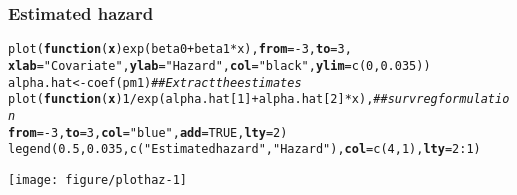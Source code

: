 \documentclass[color=usenames,dvipsnames]{beamer}\usepackage[]{graphicx}\usepackage[]{color}
\makeatletter
\newcommand{\hlnum}[1]{\textcolor[rgb]{0.69,0.494,0}{#1}}%
\newcommand{\hlstr}[1]{\textcolor[rgb]{0.749,0.012,0.012}{#1}}%
\newcommand{\hlcom}[1]{\textcolor[rgb]{0.514,0.506,0.514}{\textit{#1}}}%
\newcommand{\hlopt}[1]{\textcolor[rgb]{0,0,0}{#1}}%
\newcommand{\hlstd}[1]{\textcolor[rgb]{0,0,0}{#1}}%
\newcommand{\hlkwa}[1]{\textcolor[rgb]{0,0,0}{\textbf{#1}}}%
\newcommand{\hlkwb}[1]{\textcolor[rgb]{0,0.341,0.682}{#1}}%
\newcommand{\hlkwc}[1]{\textcolor[rgb]{0,0,0}{\textbf{#1}}}%
\newcommand{\hlkwd}[1]{\textcolor[rgb]{0.004,0.004,0.506}{#1}}%
\newenvironment{kframe}{%
 \def\at@end@of@kframe{}%
 \ifinner\ifhmode%
  \def\at@end@of@kframe{\end{minipage}}%
  \begin{minipage}{\columnwidth}%
 \fi\fi%
 \def\FrameCommand##1{\hskip\@totalleftmargin \hskip-\fboxsep
 \colorbox{shadecolor}{##1}\hskip-\fboxsep
     \hskip-\linewidth \hskip-\@totalleftmargin \hskip\columnwidth}%
 \MakeFramed {\advance\hsize-\width
   \@totalleftmargin\z@ \linewidth\hsize
   \@setminipage}}%
 {\par\unskip\endMakeFramed%
 \at@end@of@kframe}
\newenvironment{knitrout}{}{} %
\makeatother
\begin{document}
\begin{frame}[fragile]
  \frametitle{Estimated hazard}
\begin{knitrout}\scriptsize
{}\color{fgcolor}\begin{kframe}
\begin{alltt}
\hlkwd{plot}\hlstd{(}\hlkwa{function}\hlstd{(}\hlkwc{x}\hlstd{)} \hlkwd{exp}\hlstd{(beta0} \hlopt{+} \hlstd{beta1}\hlopt{*}\hlstd{x),} \hlkwc{from}\hlstd{=}\hlopt{-}\hlnum{3}\hlstd{,} \hlkwc{to}\hlstd{=}\hlnum{3}\hlstd{,}
     \hlkwc{xlab}\hlstd{=}\hlstr{"Covariate"}\hlstd{,} \hlkwc{ylab}\hlstd{=}\hlstr{"Hazard"}\hlstd{,} \hlkwc{col}\hlstd{=}\hlstr{"black"}\hlstd{,} \hlkwc{ylim}\hlstd{=}\hlkwd{c}\hlstd{(}\hlnum{0}\hlstd{,} \hlnum{0.035}\hlstd{))}
\hlstd{alpha.hat} \hlkwb{<-} \hlkwd{coef}\hlstd{(pm1)}   \hlcom{## Extract the estimates}
\hlkwd{plot}\hlstd{(}\hlkwa{function}\hlstd{(}\hlkwc{x}\hlstd{)} \hlnum{1}\hlopt{/}\hlkwd{exp}\hlstd{(alpha.hat[}\hlnum{1}\hlstd{]} \hlopt{+} \hlstd{alpha.hat[}\hlnum{2}\hlstd{]}\hlopt{*}\hlstd{x),} \hlcom{## survreg formulation}
     \hlkwc{from}\hlstd{=}\hlopt{-}\hlnum{3}\hlstd{,} \hlkwc{to}\hlstd{=}\hlnum{3}\hlstd{,} \hlkwc{col}\hlstd{=}\hlstr{"blue"}\hlstd{,} \hlkwc{add}\hlstd{=}\hlnum{TRUE}\hlstd{,} \hlkwc{lty}\hlstd{=}\hlnum{2}\hlstd{)}
\hlkwd{legend}\hlstd{(}\hlnum{0.5}\hlstd{,} \hlnum{0.035}\hlstd{,} \hlkwd{c}\hlstd{(}\hlstr{"Estimated hazard"}\hlstd{,} \hlstr{"Hazard"}\hlstd{),} \hlkwc{col}\hlstd{=}\hlkwd{c}\hlstd{(}\hlnum{4}\hlstd{,}\hlnum{1}\hlstd{),} \hlkwc{lty}\hlstd{=}\hlnum{2}\hlopt{:}\hlnum{1}\hlstd{)}
\end{alltt}
\end{kframe}

{\centering \texttt{[image: figure/plothaz-1]} 

}


\end{knitrout}
\end{frame}
\end{document}
